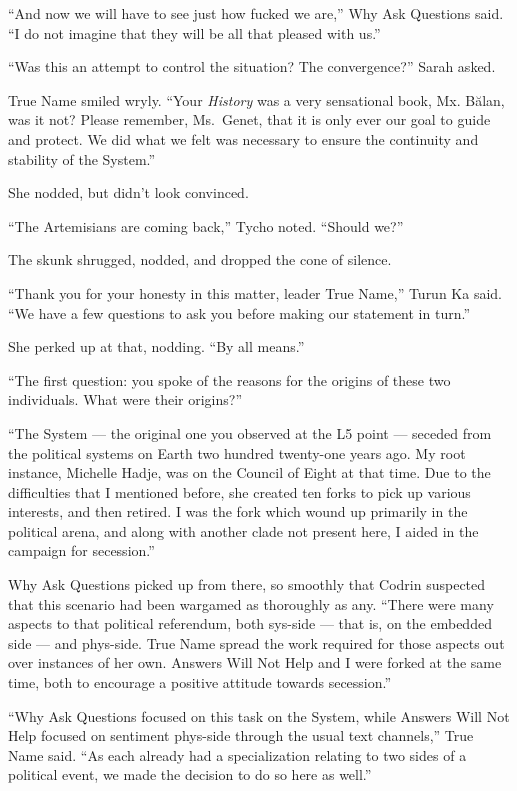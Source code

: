 ``And now we will have to see just how fucked we are,'' Why Ask Questions said. ``I do not imagine that they will be all that pleased with us.''

``Was this an attempt to control the situation? The convergence?'' Sarah asked.

True Name smiled wryly. ``Your \emph{History} was a very sensational book, Mx. Bălan, was it not? Please remember, Ms.~Genet, that it is only ever our goal to guide and protect. We did what we felt was necessary to ensure the continuity and stability of the System.''

She nodded, but didn't look convinced.

``The Artemisians are coming back,'' Tycho noted. ``Should we?''

The skunk shrugged, nodded, and dropped the cone of silence.

``Thank you for your honesty in this matter, leader True Name,'' Turun Ka said. ``We have a few questions to ask you before making our statement in turn.''

She perked up at that, nodding. ``By all means.''

``The first question: you spoke of the reasons for the origins of these two individuals. What were their origins?''

``The System — the original one you observed at the L5 point — seceded from the political systems on Earth two hundred twenty-one years ago. My root instance, Michelle Hadje, was on the Council of Eight at that time. Due to the difficulties that I mentioned before, she created ten forks to pick up various interests, and then retired. I was the fork which wound up primarily in the political arena, and along with another clade not present here, I aided in the campaign for secession.''

Why Ask Questions picked up from there, so smoothly that Codrin suspected that this scenario had been wargamed as thoroughly as any. ``There were many aspects to that political referendum, both sys-side — that is, on the embedded side — and phys-side. True Name spread the work required for those aspects out over instances of her own. Answers Will Not Help and I were forked at the same time, both to encourage a positive attitude towards secession.''

``Why Ask Questions focused on this task on the System, while Answers Will Not Help focused on sentiment phys-side through the usual text channels,'' True Name said. ``As each already had a specialization relating to two sides of a political event, we made the decision to do so here as well.''

